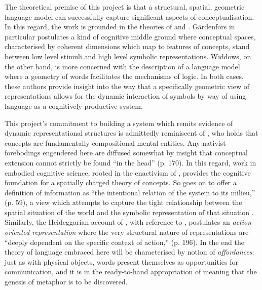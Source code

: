 The theoretical premise of this project is that a structural, spatial, geometric language model can successfully capture significant aspects of conceptualisation.  In this regard, the work is grounded in the theories of \cite{Gardenfors} and \cite{Widdows}.  G\"{a}rdenfors in particular postulates a kind of cognitive middle ground where conceptual spaces, characterised by coherent dimensions which map to features of concepts, stand between low level stimuli and high level symbolic representations.  Widdows, on the other hand, is more concerned with the description of a language model where a geometry of words facilitates the mechanisms of logic.  In both cases, these authors provide insight into the way that a specifically geometric view of representations allows for the dynamic interaction of symbols by way of using language as a cognitively productive system.

This project's commitment to building a system which remits evidence of dynamic representational structures is admittedly reminiscent of \cite{Fodor}, who holds that concepts are fundamentally compositional mental entities.  Any nativist forebodings engendered here are diffused somewhat by  insight that conceptual extension cannot strictly be found ``in the head'' (p. 170).  In this regard, work in embodied cognitive science, rooted in the enactivism of \cite{Varela}, provides the cognitive foundation for a spatially charged theory of concepts.  So \cite{Thompson} goes on to offer a definition of information as ``the intentional relation of the system to its milieu,'' (p. 59), a view which attempts to capture the tight relationship between the spatial situation of the world and the symbolic representation of that situation \citep[][is another notable proponent of this approach]{Pattee}.  Similarly, the Heideggarian account of \cite{Wheeler}, with reference to \cite{Clark}, postulates an \emph{action-oriented representation} where the very structural nature of representations are ``deeply dependent on the specific context of action,'' (p. 196).  In the end the theory of language embraced here will be characterised by  notion of \emph{affordances}: just as with physical objects, words present themselves as opportunities for communication, and it is in the ready-to-hand appropriation of meaning that the genesis of metaphor is to be discovered.

